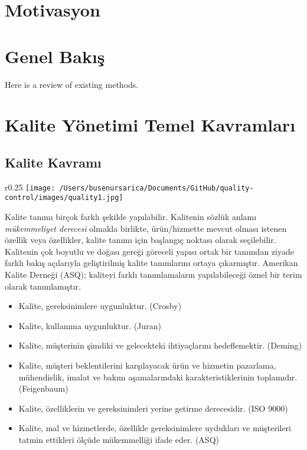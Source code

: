 \documentclass[
]{book}
\providecommand{\tightlist}{%
  \setlength{\itemsep}{0pt}\setlength{\parskip}{0pt}}
\begin{document}
\hypertarget{motivasyon}{%
\chapter{Motivasyon}\label{motivasyon}}

\hypertarget{genel-bakux131ux15f}{%
\chapter{Genel Bakış}\label{genel-bakux131ux15f}}

Here is a review of existing methods.

\hypertarget{kalite-yuxf6netimi-temel-kavramlarux131}{%
\chapter{Kalite Yönetimi Temel Kavramları}\label{kalite-yuxf6netimi-temel-kavramlarux131}}

\hypertarget{kalite-kavramux131}{%
\section{Kalite Kavramı}\label{kalite-kavramux131}}

\begin{wrapfigure}{r}{0.25\textwidth}
\texttt{[image: /Users/busenursarica/Documents/GitHub/quality-control/images/quality1.jpg]}
\end{wrapfigure}

Kalite tanımı birçok farklı şekilde yapılabilir. Kalitenin sözlük anlamı \emph{mükemmeliyet derecesi} olmakla birlikte, ürün/hizmette mevcut olması istenen özellik veya özellikler, kalite tanımı için başlangıç noktası olarak seçilebilir. Kalitenin çok boyutlu ve doğası gereği göreceli yapısı ortak bir tanımdan ziyade farklı bakış açılarıyla geliştirilmiş kalite tanımlarını ortaya çıkarmıştır. Amerikan Kalite Derneği (ASQ); kaliteyi farklı tanımlamaların yapılabileceği öznel bir terim olarak tanımlamıştır.

\begin{itemize}
\tightlist
\item
  Kalite, gereksinimlere uygunluktur. (Crosby)
\item
  Kalite, kullanıma uygunluktur. (Juran)
\item
  Kalite, müşterinin şimdiki ve gelecekteki ihtiyaçlarını hedeflemektir. (Deming)
\item
  Kalite, müşteri beklentilerini karşılayacak ürün ve hizmetin pazarlama, mühendislik, imalat ve bakım aşamalarındaki karakteristiklerinin toplamıdır. (Feigenbaum)
\item
  Kalite, özelliklerin ve gereksinimleri yerine getirme derecesidir. (ISO 9000)
\item
  Kalite, mal ve hizmetlerde, özellikle gereksinimlere uydukları ve müşterileri tatmin ettikleri ölçüde mükemmelliği ifade eder. (ASQ)
\end{itemize}
\end{document}
